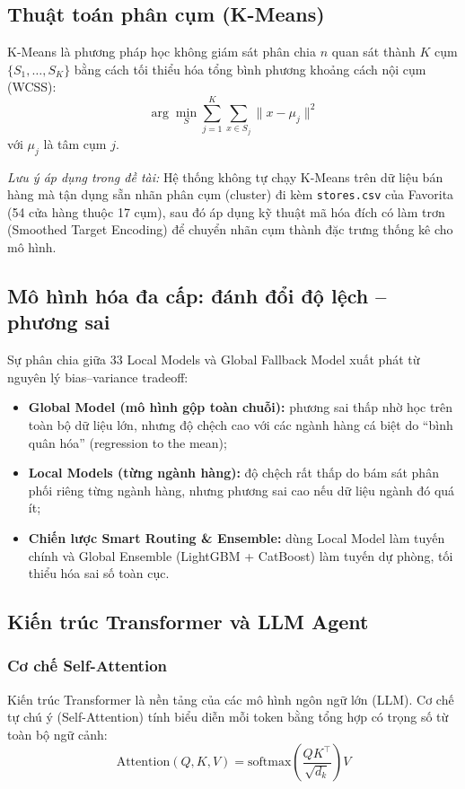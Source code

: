\documentclass[12pt,a4paper]{report}
\begin{document}
\subsection{Thuật toán phân cụm (K-Means)}
K-Means là phương pháp học không giám sát phân chia $n$ quan sát thành $K$ cụm $\{S_1,\dots,S_K\}$ bằng cách tối thiểu hóa tổng bình phương khoảng cách nội cụm (WCSS):
\[
    \arg\min_{S} \sum_{j=1}^{K}\sum_{x \in S_j} \lVert x - \mu_j \rVert^2
\]
với $\mu_j$ là tâm cụm $j$.

\textit{Lưu ý áp dụng trong đề tài:} Hệ thống không tự chạy K-Means trên dữ liệu bán hàng mà tận dụng sẵn nhãn phân cụm (cluster) đi kèm \texttt{stores.csv} của Favorita (54 cửa hàng thuộc 17 cụm), sau đó áp dụng kỹ thuật mã hóa đích có làm trơn (Smoothed Target Encoding) để chuyển nhãn cụm thành đặc trưng thống kê cho mô hình.

\subsection{Mô hình hóa đa cấp: đánh đổi độ lệch -- phương sai}
Sự phân chia giữa 33 Local Models và Global Fallback Model xuất phát từ nguyên lý bias--variance tradeoff:
\begin{itemize}
    \item \textbf{Global Model (mô hình gộp toàn chuỗi):} phương sai thấp nhờ học trên toàn bộ dữ liệu lớn, nhưng độ chệch cao với các ngành hàng cá biệt do ``bình quân hóa'' (regression to the mean);
    \item \textbf{Local Models (từng ngành hàng):} độ chệch rất thấp do bám sát phân phối riêng từng ngành hàng, nhưng phương sai cao nếu dữ liệu ngành đó quá ít;
    \item \textbf{Chiến lược Smart Routing \& Ensemble:} dùng Local Model làm tuyến chính và Global Ensemble (LightGBM + CatBoost) làm tuyến dự phòng, tối thiểu hóa sai số toàn cục.
\end{itemize}

\subsection{Kiến trúc Transformer và LLM Agent}
\subsubsection{Cơ chế Self-Attention}
Kiến trúc Transformer là nền tảng của các mô hình ngôn ngữ lớn (LLM). Cơ chế tự chú ý (Self-Attention) tính biểu diễn mỗi token bằng tổng hợp có trọng số từ toàn bộ ngữ cảnh:
\[
    \mathrm{Attention}(Q,K,V) = \mathrm{softmax}\!\left(\frac{QK^{\top}}{\sqrt{d_k}}\right)V
\]
\end{document}
